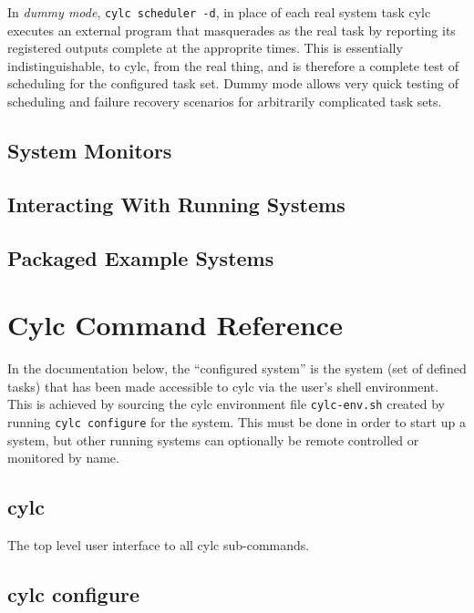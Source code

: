\documentclass[11pt,a4paper]{article}
\begin{document}
In {\em dummy mode}, \verb=cylc scheduler -d=, in place of each real
system task cylc executes an external program that masquerades as the
real task by reporting its registered outputs complete at the approprite
times. This is essentially indistinguishable, to cylc, from the real
thing, and is therefore a complete test of scheduling for the configured
task set. Dummy mode allows very quick testing of scheduling and failure
recovery scenarios for arbitrarily complicated task sets.


\subsection{System Monitors}

\subsection{Interacting With Running Systems}

\subsection{Packaged Example Systems}

\pagebreak
\section{Cylc Command Reference}

\lstset{
language=,
xleftmargin=2em,
basicstyle=\tiny\ttfamily
}

In the documentation below, the ``configured system'' is the system
(set of defined tasks) that has been made accessible to cylc via the
user's shell environment. This is achieved by sourcing the cylc
environment file \verb=cylc-env.sh= created by running 
\verb=cylc configure= for the system. This must be done in order to
start up a system, but other running systems can optionally be remote
controlled or monitored by name.

\pagebreak
\subsection{cylc}

The top level user interface to all cylc sub-commands.

{
\color{Magenta}

}


\pagebreak
\subsection{cylc configure}
\end{document}
